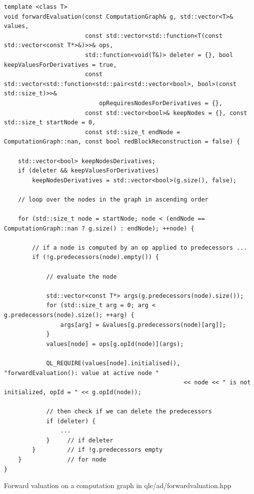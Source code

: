 \documentclass[12pt, a4paper]{report}
\begin{document}
\begin{listing}[hbt]
\begin{verbatim}
template <class T>
void forwardEvaluation(const ComputationGraph& g, std::vector<T>& values,
                       const std::vector<std::function<T(const std::vector<const T*>&)>>& ops,
                       std::function<void(T&)> deleter = {}, bool keepValuesForDerivatives = true,
                       const std::vector<std::function<std::pair<std::vector<bool>, bool>(const std::size_t)>>&
                           opRequiresNodesForDerivatives = {},
                       const std::vector<bool>& keepNodes = {}, const std::size_t startNode = 0,
                       const std::size_t endNode = ComputationGraph::nan, const bool redBlockReconstruction = false) {

    std::vector<bool> keepNodesDerivatives;
    if (deleter && keepValuesForDerivatives)
        keepNodesDerivatives = std::vector<bool>(g.size(), false);

    // loop over the nodes in the graph in ascending order

    for (std::size_t node = startNode; node < (endNode == ComputationGraph::nan ? g.size() : endNode); ++node) {

        // if a node is computed by an op applied to predecessors ...
        if (!g.predecessors(node).empty()) {

            // evaluate the node

            std::vector<const T*> args(g.predecessors(node).size());
            for (std::size_t arg = 0; arg < g.predecessors(node).size(); ++arg) {
                args[arg] = &values[g.predecessors(node)[arg]];
            }
            values[node] = ops[g.opId(node)](args);

            QL_REQUIRE(values[node].initialised(), "forwardEvaluation(): value at active node "
                                                   << node << " is not initialized, opId = " << g.opId(node));

            // then check if we can delete the predecessors
            if (deleter) {
                ...
            }     // if deleter
        }         // if !g.predecessors empty
    }             // for node
}
\end{verbatim}
\caption{Forward valuation on a computation graph in qle/ad/forwardvaluation.hpp}
\label{lst:forwardvaluation}
\end{listing}
\end{document}
